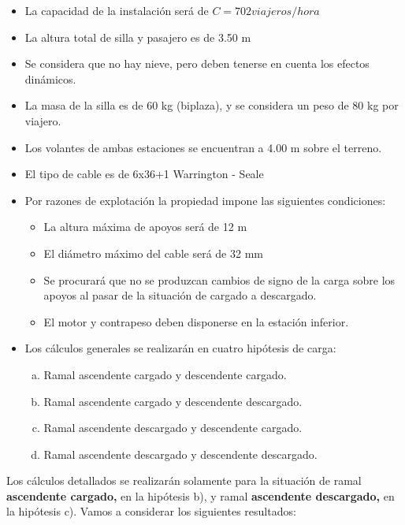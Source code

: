 \documentclass[a4paper,11pt]{article}
\begin{document}
\begin{itemize}
\item La capacidad de la instalación será de $C=702 viajeros/hora$
\item La altura total de silla y pasajero es de 3.50 m
\item Se considera que no hay nieve, pero deben tenerse en cuenta los efectos dinámicos.
\item La masa de la silla es de 60 kg (biplaza), y se considera un peso de 80 kg por viajero.
\item Los volantes de ambas estaciones se encuentran a 4.00 m sobre el terreno.
\item El tipo de cable es de 6x36+1 Warrington - Seale
\item Por razones de explotación la propiedad impone las siguientes condiciones:
\begin{itemize}
\item La altura máxima de apoyos será de 12 m
\item El diámetro máximo del cable será de 32 mm
\item Se procurará que no se produzcan cambios de signo de la carga sobre los apoyos al pasar de la situación de cargado a descargado.
\item El motor y contrapeso deben disponerse en la estación inferior.
\end{itemize}
\item Los cálculos generales se realizarán en cuatro hipótesis de carga:
\begin{enumerate}[a)]
\item Ramal ascendente cargado y descendente cargado.
\item Ramal ascendente cargado y descendente descargado.
\item Ramal ascendente descargado y descendente cargado.
\item Ramal ascendente descargado y descendente descargado.
\end{enumerate}
\end{itemize}
Los cálculos detallados se realizarán solamente para la situación de ramal {\bf ascendente cargado,} en la hipótesis b), y ramal {\bf ascendente descargado,} en la hipótesis c).
Vamos a considerar los siguientes resultados:
\end{document}
